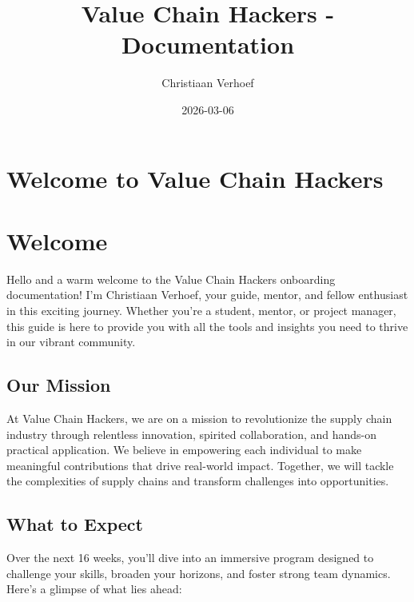 \documentclass[
  letterpaper,
  DIV=11,
  numbers=noendperiod]{scrreprt}
\title{Value Chain Hackers - Documentation}
\author{Christiaan Verhoef}
\date{2026-03-06}
\renewcommand*\contentsname{Table of contents}
\newcommand\contentsname{Table of contents}
\begin{document}
\maketitle

\renewcommand*\contentsname{Table of contents}
{
\hypersetup{linkcolor=}
\setcounter{tocdepth}{2}
\tableofcontents
}

\chapter{Welcome to Value Chain
Hackers}\label{welcome-to-value-chain-hackers}


\chapter{Welcome}\label{welcome}

Hello and a warm welcome to the Value Chain Hackers onboarding
documentation! I'm Christiaan Verhoef, your guide, mentor, and fellow
enthusiast in this exciting journey. Whether you're a student, mentor,
or project manager, this guide is here to provide you with all the tools
and insights you need to thrive in our vibrant community.

\section{Our Mission}\label{our-mission}

At Value Chain Hackers, we are on a mission to revolutionize the supply
chain industry through relentless innovation, spirited collaboration,
and hands-on practical application. We believe in empowering each
individual to make meaningful contributions that drive real-world
impact. Together, we will tackle the complexities of supply chains and
transform challenges into opportunities.

\section{What to Expect}\label{what-to-expect}

Over the next 16 weeks, you'll dive into an immersive program designed
to challenge your skills, broaden your horizons, and foster strong team
dynamics. Here's a glimpse of what lies ahead:
\end{document}
